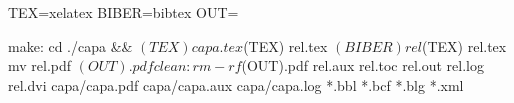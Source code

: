 TEX=xelatex
BIBER=bibtex
OUT=

make:
	cd ./capa && $(TEX) capa.tex
	$(TEX) rel.tex
	$(BIBER) rel
	$(TEX) rel.tex
	mv rel.pdf $(OUT).pdf

clean:
	rm -rf $(OUT).pdf rel.aux rel.toc rel.out rel.log rel.dvi capa/capa.pdf capa/capa.aux capa/capa.log *.bbl *.bcf *.blg *.xml
